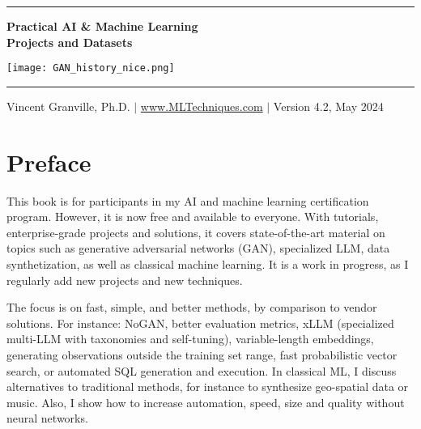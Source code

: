 \documentclass[oneside,10pt]{book}
\begin{document}
\hypersetup{linkcolor=blue}

\baselineskip
\thispagestyle{empty}
\hspace{0pt}
\vfill
\begin{center}
\rule{0.90\textwidth}{.4pt}
\end{center}

\begin{center}
{\Huge \bf{Practical AI \& Machine Learning \vspace{0.3ex}\\ Projects and Datasets} }  
\end{center}


\baselineskip
\addvspace{2cm}
\begin{center}
\texttt{[image: GAN\_history\_nice.png]}  
\end{center}
\addvspace{2cm}
\begin{center}
\rule{0.90\textwidth}{.4pt}
\end{center}
\begin{center}
Vincent Granville, Ph.D. $|$ \href{https://mltechniques.com/}{www.MLTechniques.com} $|$ Version 4.2, May 2024 
\end{center}

\hypersetup{linkcolor=red} %

\vfill
\hspace{0pt}
\pagebreak

\chapter*{Preface} %

This book is for participants in my AI and machine learning certification program. However, it is now free and available to everyone. With tutorials, enterprise-grade projects and solutions, it covers state-of-the-art material on topics such as generative adversarial networks (GAN), specialized LLM, data synthetization, as well as classical machine learning. It is a work in progress, as I regularly add new projects and new techniques.

The focus is on fast, simple, and better methods, by comparison to vendor solutions. For instance: NoGAN, better evaluation metrics, xLLM (specialized multi-LLM with taxonomies and self-tuning), variable-length embeddings, generating observations outside the training set range, fast probabilistic vector search, or automated SQL generation and execution. In classical ML, I discuss alternatives to traditional methods, for instance to synthesize geo-spatial data or music. Also, I show how to increase automation, speed, size and quality without neural networks.
\end{document}

